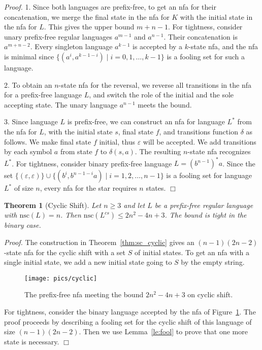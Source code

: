 \documentclass[copyright]{eptcs}
\newtheorem{theorem}{Theorem}
\newcommand{\eps}{\varepsilon}
\newcommand{\nsc}{\mathrm{nsc}}
\renewcommand{\le}{\leqslant}
\renewcommand{\ge}{\geqslant}
\begin{document}
 \noindent\emph{Proof.}
  1. Since both languages are prefix-free,
  to get an nfa for their concatenation,
  we  merge the final state in the nfa for $K$
  with the initial state  in the nfa for $L$.
  This gives the upper bound $m+n-1$.
  For tightness, consider unary  prefix-free regular languages 
  $a^{m-1}$ and $a^{n-1}$.
  Their concatenation  is $a^{m+n-2}$.
  Every singleton language $a^{k-1}$
  is accepted by a $k$-state nfa, and the nfa is minimal
  since  $\{(a^i,a^{k-1-i}) \mid i=0,1,\ldots,k-1\}$
  is a fooling set for such a language.

  2. To obtain an $n$-state nfa for the reversal,
  we reverse all transitions in the nfa for a prefix-free language $L$,
  and switch the role of the initial and the sole accepting state.
  The unary language $a^{n-1}$ meets the bound.

  3. Since  language $L$ is prefix-free,
  we can construct an nfa for  language $L^*$
  from the nfa for $L$, with the initial state $s$, final state $f$,
  and transitions function $\delta$ as follows.
  We make  final  state $f$ initial, thus $\eps$ will be accepted.
  We add transitions by each symbol $a$
  from state $f$  to $\delta(s,a)$.
  The resulting $n$-state nfa recognizes $L^*$.
  For tightness, consider  binary prefix-free language $L=(b^{n-1})^*a$.
  Since the set 
   $\{(\eps,\eps)\}\cup\{(b^i,b^{n-1-i}a) \mid i=1,2,\ldots,n-1\}$
  is a fooling set for  language $L^*$ of size $n$,
  every nfa for the star  requires $n$ states.
 \hfill$\Box$

 \begin{theorem}[Cyclic Shift]\label{thm:cyclic}
  Let $n\ge3$ and let $L$ be a prefix-free regular language  with $\nsc(L)=n$.
  Then $\nsc(L^{cs})\le 2n^2-4n+3$.
  The bound is tight in the binary case.
 \end{theorem}

 \noindent\emph{Proof.}
  The construction in  Theorem~\ref{thm:sc_cyclic}
  gives an $(n-1)(2n-2)$-state nfa for the cyclic shift
  with a set $S$
  of initial states.
  To get an nfa with a single initial state,
  we add a new initial state going to $S$ by the empty string.
  \begin{figure}[b]
  \centerline{\texttt{[image: pics/cyclic]}}
  \caption{The prefix-free nfa meeting the bound $2n^2-4n+3$ on cyclic shift.}
  \label{fig:cyclic}
  \end{figure}
  For tightness, consider the binary language
  accepted by the nfa of Figure~\ref{fig:cyclic}.
  The proof proceeds by  describing a fooling set 
  for the cyclic shift of this language
  of size $(n-1)(2n-2)$. Then we use Lemma~\ref{le:fool}
  to prove that one more state is necessary. 
 \hfill$\Box$



\end{document}
